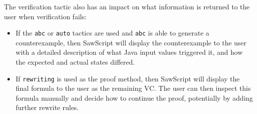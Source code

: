 \documentclass[12pt]{galois-whitepaper}
\newcommand{\sawScript}{{\sc SawScript}\xspace}
\begin{document}
The verification tactic also has an impact on what information is returned
to the user when verification fails:
\begin{itemize}

  \item If the {\tt abc} or {\tt auto} tactics are used and {\tt abc} is able
          to generate a counterexample, then \sawScript will display the
          counterexample to the user with a detailed description of what Java
          input values triggered it, and how the expected and
          actual states differed.

  \item If {\tt rewriting} is used as the proof method, then \sawScript will
         display the final formula to the user as the remaining VC. The user
         can then inspect this formula manually and decide how to continue
         the proof, potentially by adding further rewrite rules.

\end{itemize}
\end{document}
